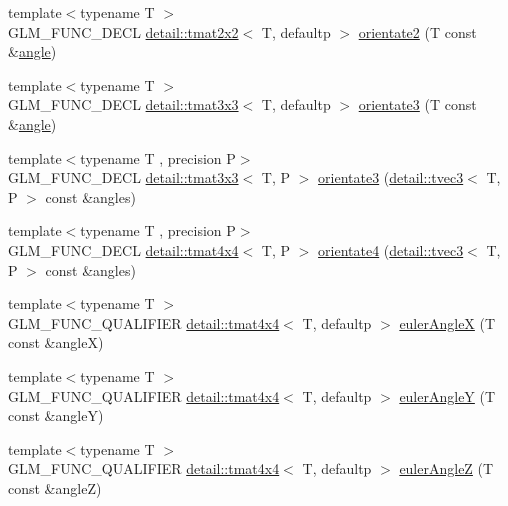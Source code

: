 \begin{DoxyCompactItemize}
\item 
{\footnotesize template$<$typename T $>$ }\\G\+L\+M\+\_\+\+F\+U\+N\+C\+\_\+\+D\+E\+CL \hyperlink{structglm_1_1detail_1_1tmat2x2}{detail\+::tmat2x2}$<$ T, defaultp $>$ \hyperlink{group__gtx__euler__angles_gab39476f0decc117783e02ba389a04ee7}{orientate2} (T const \&\hyperlink{group__gtc__quaternion_ga23a3fc7ada5bbb665ff84c92c6e0542c}{angle})
\item 
{\footnotesize template$<$typename T $>$ }\\G\+L\+M\+\_\+\+F\+U\+N\+C\+\_\+\+D\+E\+CL \hyperlink{structglm_1_1detail_1_1tmat3x3}{detail\+::tmat3x3}$<$ T, defaultp $>$ \hyperlink{group__gtx__euler__angles_ga2c94907d441c40beb413fe3284c1b267}{orientate3} (T const \&\hyperlink{group__gtc__quaternion_ga23a3fc7ada5bbb665ff84c92c6e0542c}{angle})
\item 
{\footnotesize template$<$typename T , precision P$>$ }\\G\+L\+M\+\_\+\+F\+U\+N\+C\+\_\+\+D\+E\+CL \hyperlink{structglm_1_1detail_1_1tmat3x3}{detail\+::tmat3x3}$<$ T, P $>$ \hyperlink{group__gtx__euler__angles_gab6a2a986916647ddedc94bbd2516f20c}{orientate3} (\hyperlink{structglm_1_1detail_1_1tvec3}{detail\+::tvec3}$<$ T, P $>$ const \&angles)
\item 
{\footnotesize template$<$typename T , precision P$>$ }\\G\+L\+M\+\_\+\+F\+U\+N\+C\+\_\+\+D\+E\+CL \hyperlink{structglm_1_1detail_1_1tmat4x4}{detail\+::tmat4x4}$<$ T, P $>$ \hyperlink{group__gtx__euler__angles_ga3b9f62da9726cdad708df41712792082}{orientate4} (\hyperlink{structglm_1_1detail_1_1tvec3}{detail\+::tvec3}$<$ T, P $>$ const \&angles)
\item 
{\footnotesize template$<$typename T $>$ }\\G\+L\+M\+\_\+\+F\+U\+N\+C\+\_\+\+Q\+U\+A\+L\+I\+F\+I\+ER \hyperlink{structglm_1_1detail_1_1tmat4x4}{detail\+::tmat4x4}$<$ T, defaultp $>$ \hyperlink{group__gtx__euler__angles_ga97994e53d856ae89ed2622d66ab86c2c}{euler\+AngleX} (T const \&angleX)
\item 
{\footnotesize template$<$typename T $>$ }\\G\+L\+M\+\_\+\+F\+U\+N\+C\+\_\+\+Q\+U\+A\+L\+I\+F\+I\+ER \hyperlink{structglm_1_1detail_1_1tmat4x4}{detail\+::tmat4x4}$<$ T, defaultp $>$ \hyperlink{group__gtx__euler__angles_gacdc188a23a928d57d4490ff7d646fb96}{euler\+AngleY} (T const \&angleY)
\item 
{\footnotesize template$<$typename T $>$ }\\G\+L\+M\+\_\+\+F\+U\+N\+C\+\_\+\+Q\+U\+A\+L\+I\+F\+I\+ER \hyperlink{structglm_1_1detail_1_1tmat4x4}{detail\+::tmat4x4}$<$ T, defaultp $>$ \hyperlink{group__gtx__euler__angles_gaf55b28c29ebd7ba728f1ad6490c89687}{euler\+AngleZ} (T const \&angleZ)

\end{DoxyCompactItemize}
